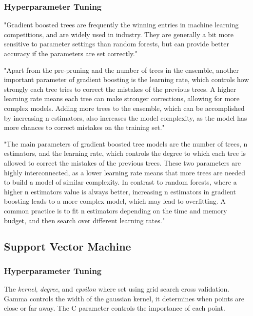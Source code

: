 \subsubsection*{Hyperparameter Tuning}

"Gradient boosted trees are frequently the winning entries in machine
learning competitions, and are widely used in industry. They are
generally a bit more sensitive to parameter settings than random
forests, but can provide better accuracy if the parameters are set
correctly." \cite[p. 88-89]{muller_introductionmachinelearning_2016}

"Apart from the pre-pruning and the number of trees in the ensemble,
another important parameter of gradient boosting is the learning rate,
which controls how strongly each tree tries to correct the mistakes of
the previous trees. A higher learning rate means each tree can make
stronger corrections, allowing for more complex models. Adding more trees to
the ensemble, which
can be accomplished
by increasing
n estimators, also increases the model complexity, as the model has
more chances to correct mistakes on the training set." \cite[p.
88-89]{muller_introductionmachinelearning_2016}

"The main parameters of gradient boosted tree models are the number
of trees, n estimators, and the learning rate, which controls the degree to
which each tree is
allowed to correct the
mistakes of the previous trees.
These two parameters are highly interconnected, as a lower
learning rate means that more trees are needed to build a model of
similar complexity. In contrast to random forests, where a higher
n estimators value is always better, increasing n estimators in gradient
boosting leads to a more complex model, which may lead to overfitting. A
common practice is to fit n estimators depending on the time and
memory budget, and then search over different learning rates." \cite[p.
88-89]{muller_introductionmachinelearning_2016}

\subsection{Support Vector Machine}\label{subsec:support-vector-machine}

\subsubsection*{Hyperparameter Tuning}
The \textit{kernel}, \textit{degree},  and \textit{epsilon}
where set using grid
search cross validation.
Gamma controls the width of the gaussian kernel, it determines when points
are close or far away.
The C parameter controls the importance of each point.

